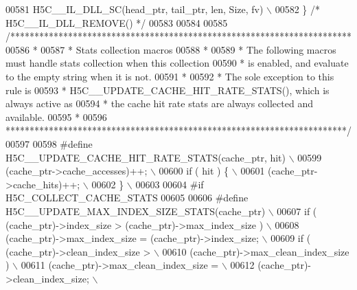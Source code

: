 \begin{DoxyCode}
00581 \textcolor{preprocessor}{    H5C\_\_IL\_DLL\_SC(head\_ptr, tail\_ptr, len, Size, fv)                       \(\backslash\)}
00582 \textcolor{preprocessor}{\} }\textcolor{comment}{/* H5C\_\_IL\_DLL\_REMOVE() */}\textcolor{preprocessor}{}
00583 
00584 
00585 \textcolor{comment}{/***********************************************************************}
00586 \textcolor{comment}{ *}
00587 \textcolor{comment}{ * Stats collection macros}
00588 \textcolor{comment}{ *}
00589 \textcolor{comment}{ * The following macros must handle stats collection when this collection}
00590 \textcolor{comment}{ * is enabled, and evaluate to the empty string when it is not.}
00591 \textcolor{comment}{ *}
00592 \textcolor{comment}{ * The sole exception to this rule is}
00593 \textcolor{comment}{ * H5C\_\_UPDATE\_CACHE\_HIT\_RATE\_STATS(), which is always active as}
00594 \textcolor{comment}{ * the cache hit rate stats are always collected and available.}
00595 \textcolor{comment}{ *}
00596 \textcolor{comment}{ ***********************************************************************/}
00597 
00598 \textcolor{preprocessor}{#define H5C\_\_UPDATE\_CACHE\_HIT\_RATE\_STATS(cache\_ptr, hit) \(\backslash\)}
00599 \textcolor{preprocessor}{        (cache\_ptr->cache\_accesses)++;                   \(\backslash\)}
00600 \textcolor{preprocessor}{        if ( hit ) \{                                     \(\backslash\)}
00601 \textcolor{preprocessor}{            (cache\_ptr->cache\_hits)++;                   \(\backslash\)}
00602 \textcolor{preprocessor}{        \}                                                \(\backslash\)}
00603 \textcolor{preprocessor}{}
00604 \textcolor{preprocessor}{#if H5C\_COLLECT\_CACHE\_STATS}
00605 
00606 \textcolor{preprocessor}{#define H5C\_\_UPDATE\_MAX\_INDEX\_SIZE\_STATS(cache\_ptr)                        \(\backslash\)}
00607 \textcolor{preprocessor}{        if ( (cache\_ptr)->index\_size > (cache\_ptr)->max\_index\_size )       \(\backslash\)}
00608 \textcolor{preprocessor}{            (cache\_ptr)->max\_index\_size = (cache\_ptr)->index\_size;         \(\backslash\)}
00609 \textcolor{preprocessor}{        if ( (cache\_ptr)->clean\_index\_size >                               \(\backslash\)}
00610 \textcolor{preprocessor}{                (cache\_ptr)->max\_clean\_index\_size )                        \(\backslash\)}
00611 \textcolor{preprocessor}{            (cache\_ptr)->max\_clean\_index\_size =                            \(\backslash\)}
00612 \textcolor{preprocessor}{                (cache\_ptr)->clean\_index\_size;                             \(\backslash\)}

\end{DoxyCode}
